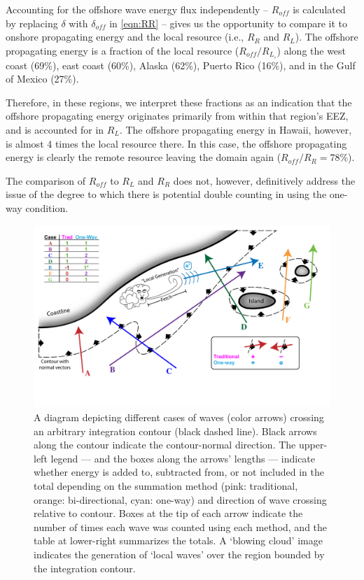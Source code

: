 Accounting for the offshore wave energy flux independently -- $R_{off}$ is calculated by replacing $\delta$ with $\delta_{off}$ in \eqref{eqn:RR} -- gives us the opportunity to compare it to onshore propagating energy and the local resource (i.e., $R_R$ and $R_L$). The offshore propagating energy is a fraction of the local resource ($R_{off} / R_L_\circ$) along the west coast (69\%), east coast (60\%), Alaska (62\%), Puerto Rico (16\%), and in the Gulf of Mexico (27\%). 

Therefore, in these regions, we interpret these fractions as an indication that the offshore propagating energy originates primarily from within that region's EEZ, and is accounted for in $R_L$. 
The offshore propagating energy in Hawaii, however, is almost 4 times the local resource there. In this case, the offshore propagating energy is clearly the remote resource leaving the domain again ($R_{off} / R_R = 78\%$).

The comparison of $R_{off}$ to $R_L$ and $R_R$ does not, however, definitively address the issue of the degree to which there is potential double counting in using the one-way condition. 



\begin{figure}[ht]
    \centering
    \includegraphics[width=\linewidth]{../diagram/Schematic03.pdf}
    \caption{A diagram depicting different cases of waves (color arrows) crossing an arbitrary integration contour (black dashed line). Black arrows along the contour indicate the contour-normal direction. The upper-left legend — and the boxes along the arrows' lengths — indicate whether energy is added to, subtracted from, or not included in the total depending on the summation method (pink: traditional, orange: bi-directional, cyan: one-way) and direction of wave crossing relative to contour. Boxes at the tip of each arrow indicate the number of times each wave was counted using each method, and the table at lower-right summarizes the totals. A `blowing cloud' image indicates the generation of `local waves' over the region bounded by the integration contour. }
    \label{fig:one-way-diagram}
\end{figure}

